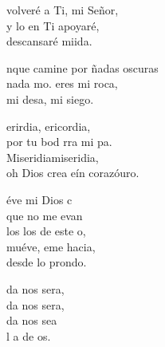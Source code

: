 \documentclass[12pt]{article}
\begin{document}
\begin{multicols*}{2}
\begin{cancion}%
	 volveré a Ti, mi Señor,\\
	y lo en Ti apoyaré,\\
	descansaré miida.\\
\end{cancion}%

\begin{cancion}[Mi roca][Ixcís]%
	nque camine por ñadas oscuras\\
	nada mo.  eres mi roca,\\
	mi desa, mi siego.\\
\end{cancion}%

\begin{cancion}[Misericordia][Ixcís]%
	erirdia, ericordia,\\
	por tu bod rra mi pa.\\
	Miseridiamiseridia,\\
	oh Dios crea eín corazóuro.  \\
\end{cancion}%

\begin{cancion}%
	éve mi Dios c \\
	que no me evan \\
	los los de este o,\\
	muéve, eme hacia, \\
	desde lo prondo.\\
\end{cancion}%

\begin{cancion}%
	da nos sera, \\
	da nos sera, \\
	da nos sea\\
	l a de os. \\
\end{cancion}%


\end{multicols*}
\end{document}
